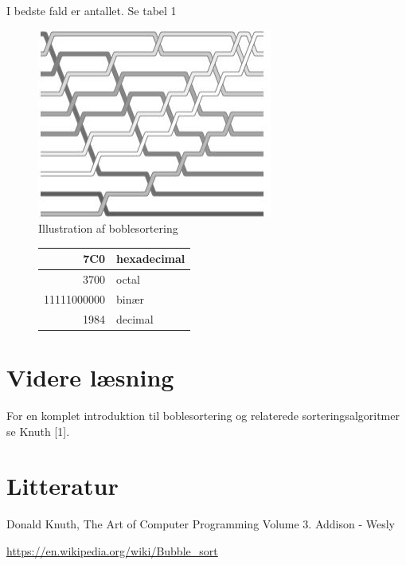 \documentclass{article}
\begin{document}
I bedste fald er antallet. Se tabel 1



\begin{figure}[H]
    \centering
     \label{fig:my_label}
\includegraphics[scale=1.0]{Udklipboble.JPG}
\caption{Illustration af boblesortering}
\end{figure}


\begin{figure}[H]
\centering
\begin{tabular}{|r|l|}
\hline
7C0 & hexadecimal\\
\hline
3700 & octal\\
\hline
11111000000 & binær\\
\hline
1984 & decimal\\
\hline

\end{tabular}    
\end{figure}




\section{Videre læsning}
For en komplet introduktion til boblesortering og relaterede sorteringsalgoritmer
se Knuth [1].


\section{Litteratur}


\begin{thebibliography}{1}

Donald Knuth,
The Art of Computer Programming
Volume 3. Addison - Wesly



\url{https://en.wikipedia.org/wiki/Bubble_sort}

\end{thebibliography}
\end{document}
